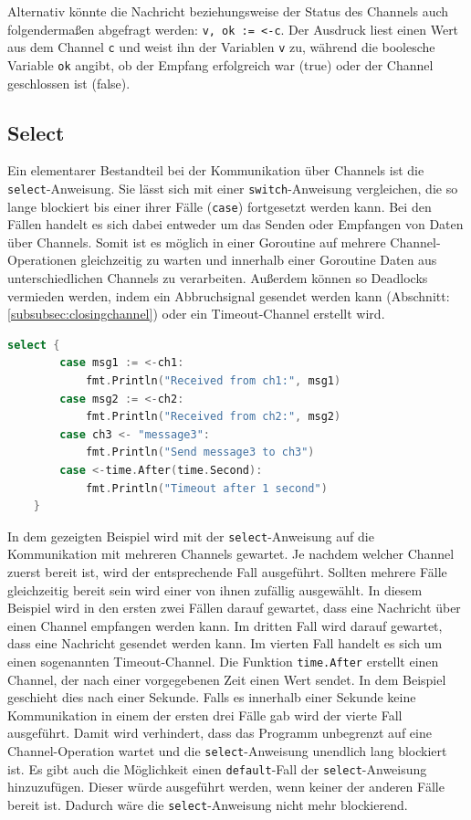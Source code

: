 \documentclass[fontsize=12pt,paper=a4,twoside=semi,parskip=half-,headsepline,headinclude]{scrreprt}
\begin{document}
Alternativ könnte die Nachricht beziehungsweise der Status des Channels auch folgendermaßen abgefragt werden: \texttt{v, ok := <-c}. Der Ausdruck liest einen Wert aus dem Channel \texttt{c} und weist ihn der Variablen \texttt{v} zu, während die boolesche Variable \texttt{ok} angibt, ob der Empfang erfolgreich war (true) oder der Channel geschlossen ist (false).

\subsection{Select}

Ein elementarer Bestandteil bei der Kommunikation über Channels ist die \texttt{select}-Anweisung\cite{GoSpecification2024}. Sie lässt sich mit einer \texttt{switch}-Anweisung vergleichen, die so lange blockiert bis einer ihrer Fälle (\texttt{case}) fortgesetzt werden kann. Bei den Fällen handelt es sich dabei entweder um das Senden oder Empfangen von Daten über Channels. Somit ist es möglich in einer Goroutine auf mehrere Channel-Operationen gleichzeitig zu warten und innerhalb einer Goroutine Daten aus unterschiedlichen Channels zu verarbeiten. Außerdem können so Deadlocks vermieden werden, indem ein Abbruchsignal gesendet werden kann (Abschnitt: \ref{subsubsec:closingchannel}) oder ein Timeout-Channel erstellt wird.

\begin{lstlisting}[language=Go,extendedchars=true]
	select {
		case msg1 := <-ch1:
			fmt.Println("Received from ch1:", msg1)
		case msg2 := <-ch2:
			fmt.Println("Received from ch2:", msg2)
		case ch3 <- "message3":
			fmt.Println("Send message3 to ch3")
		case <-time.After(time.Second):
			fmt.Println("Timeout after 1 second")
	}
\end{lstlisting}

In dem gezeigten Beispiel wird mit der \texttt{select}-Anweisung auf die Kommunikation mit mehreren Channels gewartet. Je nachdem welcher Channel zuerst bereit ist, wird der entsprechende Fall ausgeführt. Sollten mehrere Fälle gleichzeitig bereit sein wird einer von ihnen zufällig ausgewählt. In diesem Beispiel wird in den ersten zwei Fällen darauf gewartet, dass eine Nachricht über einen Channel empfangen werden kann. Im dritten Fall wird darauf gewartet, dass eine Nachricht gesendet werden kann. Im vierten Fall handelt es sich um einen sogenannten Timeout-Channel. Die Funktion \texttt{time.After} erstellt einen Channel, der nach einer vorgegebenen Zeit einen Wert sendet. In dem Beispiel geschieht dies nach einer Sekunde. Falls es innerhalb einer Sekunde keine Kommunikation in einem der ersten drei Fälle gab wird der vierte Fall ausgeführt. Damit wird verhindert, dass das Programm unbegrenzt auf eine Channel-Operation wartet und die \texttt{select}-Anweisung unendlich lang blockiert ist. Es gibt auch die Möglichkeit einen \texttt{default}-Fall der \texttt{select}-Anweisung hinzuzufügen. Dieser würde ausgeführt werden, wenn keiner der anderen Fälle bereit ist. Dadurch wäre die \texttt{select}-Anweisung nicht mehr blockierend.
\end{document}
